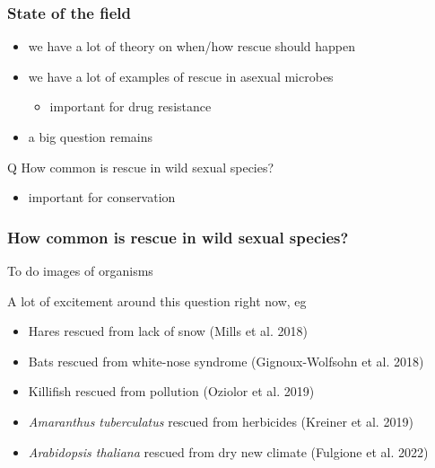 \documentclass{beamer}
\begin{document}
\begin{frame}
	\frametitle{State of the field}

	\begin{itemize}
		\item we have a lot of theory on when/how rescue should happen \pause
		\item we have a lot of examples of rescue in asexual microbes \pause
		\begin{itemize}
			\item important for drug resistance \pause
		\end{itemize}
		\item a big question remains \pause
	\end{itemize}

	\begin{block}{Q}
		How common is rescue in wild sexual species?
	\end{block}

	\begin{itemize}
		\item important for conservation
	\end{itemize}

\end{frame}


\begin{frame}
	\frametitle{How common is rescue in wild sexual species?}

	\begin{alertblock}{To do}
		images of organisms
	\end{alertblock}

	A lot of excitement around this question right now, eg \pause

	\begin{itemize}
		\item Hares rescued from lack of snow (Mills et al. 2018) \pause
		\item Bats rescued from white-nose syndrome (Gignoux-Wolfsohn et al. 2018) \pause
		\item Killifish rescued from pollution (Oziolor et al. 2019) \pause
		\item \textit{Amaranthus tuberculatus} rescued from herbicides (Kreiner et al. 2019) \pause
		\item \textit{Arabidopsis thaliana} rescued from dry new climate (Fulgione et al. 2022)
	\end{itemize}

\end{frame}
\end{document}
